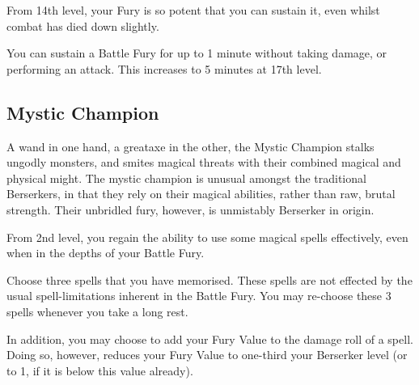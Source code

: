 {
	From 14th level, your Fury is so potent that you can sustain it, even whilst combat has died down slightly. 
	
	You can sustain a Battle Fury for up to 1 minute without taking damage, or performing an attack. This increases to 5 minutes at 17th level.
}

\subsection*{Mystic Champion}

A wand in one hand, a greataxe in the other, the Mystic Champion stalks ungodly monsters, and smites magical threats with their combined magical and physical might. The mystic champion is unusual amongst the traditional Berserkers, in that they rely on their magical abilities, rather than raw, brutal strength. Their unbridled fury, however, is unmistably Berserker in origin. 



{
From 2nd level, you regain the ability to use some magical spells effectively, even when in the depths of your Battle Fury. 

Choose three spells that you have memorised. These spells are not effected  by the usual spell-limitations inherent in the Battle Fury. You may re-choose these 3 spells whenever you take a long rest. 

In addition, you may choose to add your Fury Value to the damage roll of a spell. Doing so, however, reduces your Fury Value to one-third your Berserker level (or to 1, if it is below this value already). 

}



